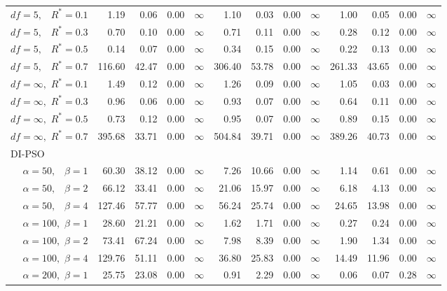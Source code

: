 \documentclass[12pt]{article}
\begin{document}
\begin{table}[ht]
{\begin{tabular}{r|rrrr|rrrr|rrrr}
  $df = 5,\enspace$ $R^* =0.1$ & 1.19 & 0.06 & 0.00 & $\infty$ & 1.10 & 0.03 & 0.00 & $\infty$ & 1.00 & 0.05 & 0.00 & $\infty$ \\ 
  $df = 5,\enspace$ $R^* =0.3$ & 0.70 & 0.10 & 0.00 & $\infty$ & 0.71 & 0.11 & 0.00 & $\infty$ & 0.28 & 0.12 & 0.00 & $\infty$ \\ 
  $df = 5,\enspace$ $R^* =0.5$ & 0.14 & 0.07 & 0.00 & $\infty$ & 0.34 & 0.15 & 0.00 & $\infty$ & 0.22 & 0.13 & 0.00 & $\infty$ \\ 
  $df = 5,\enspace$ $R^* =0.7$ & 116.60 & 42.47 & 0.00 & $\infty$ & 306.40 & 53.78 & 0.00 & $\infty$ & 261.33 & 43.65 & 0.00 & $\infty$ \\ 
  $df = \infty,$ $R^* =0.1$ & 1.49 & 0.12 & 0.00 & $\infty$ & 1.26 & 0.09 & 0.00 & $\infty$ & 1.05 & 0.03 & 0.00 & $\infty$ \\ 
  $df = \infty,$ $R^* =0.3$ & 0.96 & 0.06 & 0.00 & $\infty$ & 0.93 & 0.07 & 0.00 & $\infty$ & 0.64 & 0.11 & 0.00 & $\infty$ \\ 
  $df = \infty,$ $R^* =0.5$ & 0.73 & 0.12 & 0.00 & $\infty$ & 0.95 & 0.07 & 0.00 & $\infty$ & 0.89 & 0.15 & 0.00 & $\infty$ \\ 
  $df = \infty,$ $R^* =0.7$ & 395.68 & 33.71 & 0.00 & $\infty$ & 504.84 & 39.71 & 0.00 & $\infty$ & 389.26 & 40.73 & 0.00 & $\infty$ \\ 
\hline
\multicolumn{1}{l|}{DI-PSO} &&&&&&&&&&&&\\
  $\alpha = 50,\enspace$ $\beta =1$ & 60.30 & 38.12 & 0.00 & $\infty$ & 7.26 & 10.66 & 0.00 & $\infty$ & 1.14 & 0.61 & 0.00 & $\infty$ \\ 
  $\alpha = 50,\enspace$ $\beta =2$ & 66.12 & 33.41 & 0.00 & $\infty$ & 21.06 & 15.97 & 0.00 & $\infty$ & 6.18 & 4.13 & 0.00 & $\infty$ \\ 
  $\alpha = 50,\enspace$ $\beta =4$ & 127.46 & 57.77 & 0.00 & $\infty$ & 56.24 & 25.74 & 0.00 & $\infty$ & 24.65 & 13.98 & 0.00 & $\infty$ \\ 
  $\alpha = 100,$ $\beta =1$ & 28.60 & 21.21 & 0.00 & $\infty$ & 1.62 & 1.71 & 0.00 & $\infty$ & 0.27 & 0.24 & 0.00 & $\infty$ \\ 
  $\alpha = 100,$ $\beta =2$ & 73.41 & 67.24 & 0.00 & $\infty$ & 7.98 & 8.39 & 0.00 & $\infty$ & 1.90 & 1.34 & 0.00 & $\infty$ \\ 
  $\alpha = 100,$ $\beta =4$ & 129.76 & 51.11 & 0.00 & $\infty$ & 36.80 & 25.83 & 0.00 & $\infty$ & 14.49 & 11.96 & 0.00 & $\infty$ \\ 
  $\alpha = 200,$ $\beta =1$ & 25.75 & 23.08 & 0.00 & $\infty$ & 0.91 & 2.29 & 0.00 & $\infty$ & 0.06 & 0.07 & 0.28 & $\infty$ \\ 

\end{tabular}}
\end{table}
\end{document}
